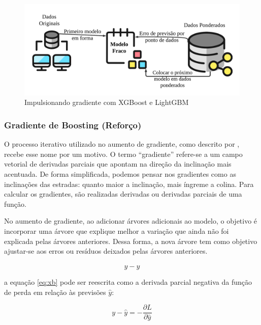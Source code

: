 \begin{figure}[H]
	\centering
	\caption{Impulsionando gradiente com XGBoost e LightGBM}
	\label{fig:xgboos}
	\includegraphics[width=\linewidth]{Modelos/Figuras/xgboos}
	
\end{figure}



\subsubsection{Gradiente de Boosting (Refor\c co)} \label{subsubsec:boosting}

O processo iterativo utilizado no aumento de gradiente, como descrito por , recebe esse nome por um motivo. O termo ``gradiente'' refere-se a um campo vetorial de derivadas parciais que apontam na direção da inclinação mais acentuada. De forma simplificada, podemos pensar nos gradientes como as inclinações das estradas: quanto maior a inclinação, mais íngreme a colina. Para calcular os gradientes, são realizadas derivadas ou derivadas parciais de uma função.

No aumento de gradiente, ao adicionar árvores adicionais ao modelo, o objetivo é incorporar uma árvore que explique melhor a variação que ainda não foi explicada pelas árvores anteriores. Dessa forma, a nova árvore tem como objetivo ajustar-se aos erros ou resíduos deixados pelas árvores anteriores.

\begin{equation}
	y-\hat{y} \label{eq:xb}
\end{equation}

\noindent a equação \eqref{eq:xb} pode ser reescrita como a derivada parcial negativa da função de perda em relação às previsões $\hat{y}$:

\begin{equation}
	y-\hat{y} = -\dfrac{\partial L}{\partial \hat{y}} \label{eq:xb2}
\end{equation}

